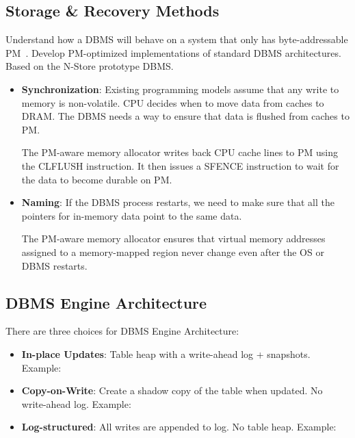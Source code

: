 \documentclass[11pt]{article}
\begin{document}
\subsection*{Storage \& Recovery Methods}
Understand how a DBMS will behave on a system that only has byte-addressable PM~\cite{Arulraj2015}. Develop PM-optimized implementations of standard DBMS architectures. Based on the N-Store prototype DBMS.
\begin{itemize}
	\item \textbf{Synchronization}: 
	Existing programming models assume that any write to memory is non-volatile. 
	CPU decides when to move data from caches to DRAM. 
	The DBMS needs a way to ensure that data is flushed from caches to PM.
	
	The PM-aware memory allocator writes back CPU cache lines to PM using the CLFLUSH instruction.
	It then issues a SFENCE instruction to wait for the data to become durable on PM.
	
	\item \textbf{Naming}:
	If the DBMS process restarts, we need to make sure that all the pointers for in-memory data point to the same data.
	
	The PM-aware memory allocator ensures that virtual memory addresses
	assigned to a memory-mapped region never change even
	after the OS or DBMS restarts.
\end{itemize}

\subsection*{DBMS Engine Architecture}
There are three choices for DBMS Engine Architecture:
\begin{itemize}
	\item \textbf{In-place Updates}: 
	Table heap with a write-ahead log + snapshots.
	Example: 
	
	\item \textbf{Copy-on-Write}:
	Create a shadow copy of the table when updated.
	No write-ahead log.
	Example: 
	
	\item \textbf{Log-structured}:
	All writes are appended to log. No table heap.
	Example: 
\end{itemize}
\end{document}
